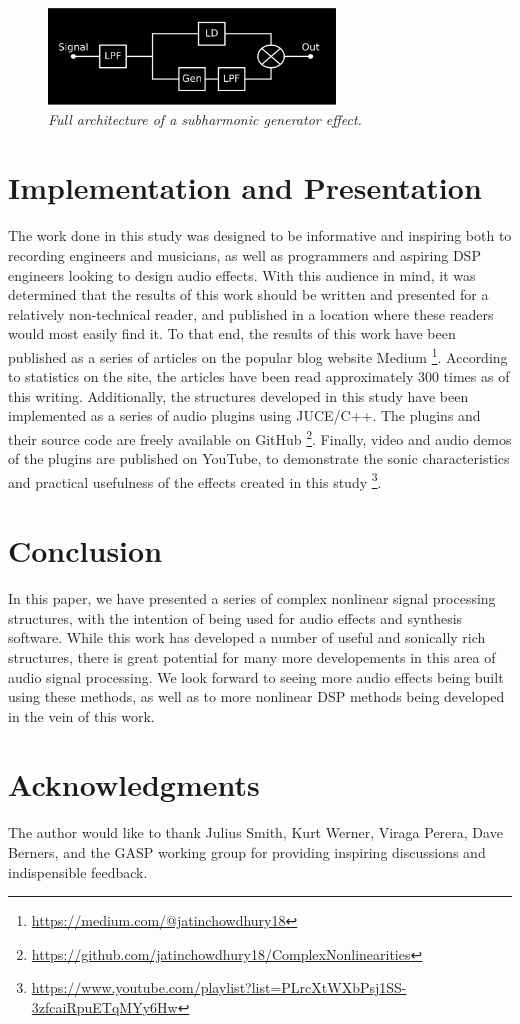 \documentclass[twoside,a4paper]{article}
\begin{document}
%
\begin{figure}[h]
    \center
    \includegraphics[width=3in]{../Subharmonics/Pics/full_arch.png}
    \caption{\label{sub_arch}{\it Full architecture of a subharmonic generator effect.}}
\end{figure}
%

\section{Implementation and Presentation} \label{sec:pres}
%
The work done in this study was designed to be informative and inspiring
both to recording engineers and musicians, as well as programmers and
aspiring DSP engineers looking to design audio effects. With this audience
in mind, it was determined that the results of this work should be written
and presented for a relatively non-technical reader, and published in a
location where these readers would most easily find it. To that end, the
results of this work have been published as a series of articles on the
popular blog website Medium \footnote{\url{https://medium.com/@jatinchowdhury18}}.
According to statistics on the site, the articles have been read approximately
300 times as of this writing. Additionally, the structures developed
in this study have been implemented as a series of audio plugins using JUCE/C++.
The plugins and their source code are freely available on GitHub
\footnote{\url{https://github.com/jatinchowdhury18/ComplexNonlinearities}}.
Finally, video and audio demos of the plugins are published on YouTube, to
demonstrate the sonic characteristics and practical usefulness of the
effects created in this study
\footnote{\url{https://www.youtube.com/playlist?list=PLrcXtWXbPsj1SS-3zfcaiRpuETqMYy6Hw}}.

\section{Conclusion} \label{sec:conclusion}
%
In this paper, we have presented a series of complex nonlinear signal
processing structures, with the intention of being used for audio effects
and synthesis software. While this work has developed a number of useful
and sonically rich structures, there is great potential for many more
developements in this area of audio signal processing. We look forward
to seeing more audio effects being built using these methods, as well as to
more nonlinear DSP methods being developed in the vein of this work.

\section{Acknowledgments}
%
The author would like to thank Julius Smith, Kurt Werner, Viraga Perera,
Dave Berners, and the GASP working group for providing inspiring discussions
and indispensible feedback.

\nocite{*}


\end{document}

